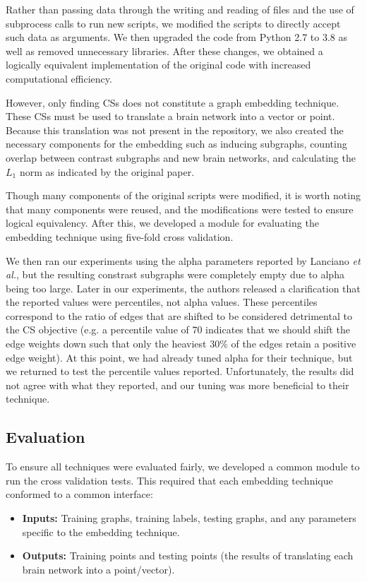 \documentclass[sigconf]{acmart}
\begin{document}
Rather than passing data through the writing and reading of files and the use of subprocess calls to run new scripts, we modified the scripts to directly accept such data as arguments.
We then upgraded the code from Python 2.7 to 3.8 as well as removed unnecessary libraries.
After these changes, we obtained a logically equivalent implementation of the original code with increased computational efficiency.

However, only finding CSs does not constitute a graph embedding technique.
These CSs must be used to translate a brain network into a vector or point.
Because this translation was not present in the repository, we also created the necessary components for the embedding such as inducing subgraphs, counting overlap between contrast subgraphs and new brain networks, and calculating the $L_1$ norm as indicated by the original paper.

Though many components of the original scripts were modified, it is worth noting that many components were reused, and the modifications were tested to ensure logical equivalency.
After this, we developed a module for evaluating the embedding technique using five-fold cross validation.

We then ran our experiments using the alpha parameters reported by Lanciano \emph{et al.}, but the resulting constrast subgraphs were completely empty due to alpha being too large.
Later in our experiments, the authors released a clarification that the reported values were percentiles, not alpha values.
These percentiles correspond to the ratio of edges that are shifted to be considered detrimental to the CS objective (e.g. a percentile value of 70 indicates that we should shift the edge weights down such that only the heaviest 30\% of the edges retain a positive edge weight).
At this point, we had already tuned alpha for their technique, but we returned to test the percentile values reported.
Unfortunately, the results did not agree with what they reported, and our tuning was more beneficial to their technique.

\subsection{Evaluation} \label{evaluation}

To ensure all techniques were evaluated fairly, we developed a common module to run the cross validation tests.
This required that each embedding technique conformed to a common interface:

\begin{itemize}
    \item \textbf{Inputs:} Training graphs, training labels, testing graphs, and any parameters specific to the embedding technique.
    \item \textbf{Outputs:} Training points and testing points (the results of translating each brain network into a point/vector).
\end{itemize}
\end{document}
